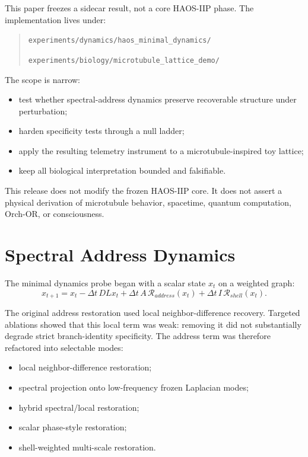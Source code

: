 \documentclass[11pt]{article}
\begin{document}
This paper freezes a sidecar result, not a core HAOS-IIP phase. The implementation lives under:
\begin{quote}
\texttt{experiments/dynamics/haos\_minimal\_dynamics/}

\texttt{experiments/biology/microtubule\_lattice\_demo/}
\end{quote}

The scope is narrow:
\begin{itemize}
\item test whether spectral-address dynamics preserve recoverable structure under perturbation;
\item harden specificity tests through a null ladder;
\item apply the resulting telemetry instrument to a microtubule-inspired toy lattice;
\item keep all biological interpretation bounded and falsifiable.
\end{itemize}

This release does not modify the frozen HAOS-IIP core. It does not assert a physical derivation of microtubule behavior, spacetime, quantum computation, Orch-OR, or consciousness.

\section{Spectral Address Dynamics}

The minimal dynamics probe began with a scalar state $x_t$ on a weighted graph:
\[
x_{t+1}
= x_t - \Delta t\,D L x_t
+ \Delta t\,A\,\mathcal{R}_{address}(x_t)
+ \Delta t\,I\,\mathcal{R}_{shell}(x_t).
\]

The original address restoration used local neighbor-difference recovery. Targeted ablations showed that this local term was weak: removing it did not substantially degrade strict branch-identity specificity. The address term was therefore refactored into selectable modes:
\begin{itemize}
\item local neighbor-difference restoration;
\item spectral projection onto low-frequency frozen Laplacian modes;
\item hybrid spectral/local restoration;
\item scalar phase-style restoration;
\item shell-weighted multi-scale restoration.
\end{itemize}
\end{document}
